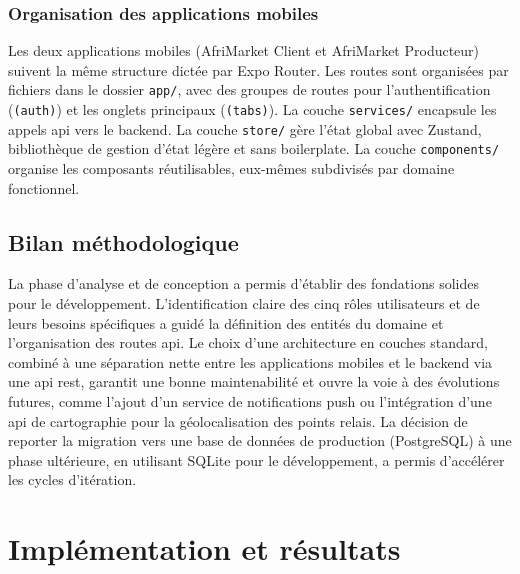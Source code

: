 \documentclass[12pt, a4paper, oneside]{report}
\begin{document}
\subsection{Organisation des applications mobiles}

Les deux applications mobiles (AfriMarket Client et AfriMarket Producteur) suivent la
même structure dictée par Expo Router. Les routes sont organisées par fichiers dans le
dossier \texttt{app/}, avec des groupes de routes pour l'authentification (\texttt{(auth)})
et les onglets principaux (\texttt{(tabs)}). La couche \texttt{services/} encapsule les
appels \gls{api} vers le backend. La couche \texttt{store/} gère l'état global avec
Zustand, bibliothèque de gestion d'état légère et sans boilerplate. La couche
\texttt{components/} organise les composants réutilisables, eux-mêmes subdivisés par
domaine fonctionnel.

\section{Bilan méthodologique}

La phase d'analyse et de conception a permis d'établir des fondations solides pour le
développement. L'identification claire des cinq rôles utilisateurs et de leurs besoins
spécifiques a guidé la définition des entités du domaine et l'organisation des routes
\gls{api}. Le choix d'une architecture en couches standard, combiné à une séparation nette
entre les applications mobiles et le backend via une \gls{api} \gls{rest}, garantit une
bonne maintenabilité et ouvre la voie à des évolutions futures, comme l'ajout d'un service
de notifications push ou l'intégration d'une \gls{api} de cartographie pour la
géolocalisation des points relais. La décision de reporter la migration vers une base de
données de production (PostgreSQL) à une phase ultérieure, en utilisant SQLite pour le
développement, a permis d'accélérer les cycles d'itération.

\chapter{Implémentation et résultats}

\end{document}

